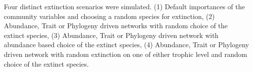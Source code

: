 \documentclass[12pt,a4paper]{article}
\begin{document}
			
 Four distinct extinction scenarios were simulated. (1) Default importances of the community variables and choosing a random species for extinction, (2) Abundance, Trait or Phylogeny driven networks with random choice of the extinct species, (3) Abundance, Trait or Phylogeny driven network with abundance based choice of the extinct species, (4) Abundance, Trait or Phylogeny driven network with random extinction on one of either trophic level and random choice of the extinct species.
 
\end{document}
